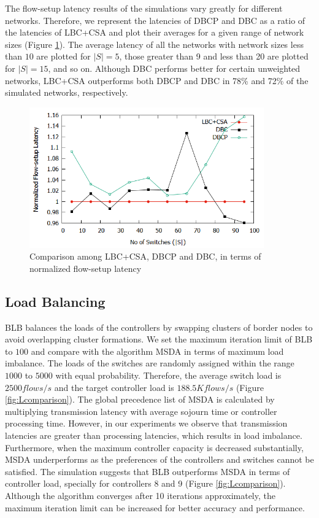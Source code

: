 \documentclass[preprint,12pt]{elsarticle}
\begin{document}
	The flow-setup latency results of the simulations vary greatly for different networks. Therefore, we represent the latencies of DBCP and DBC as a ratio of the latencies of LBC+CSA and plot their averages for a given range of network sizes (Figure \ref{fig:Fcomparison}). The average latency of all the networks with network sizes less than $10$ are plotted for $|S|=5$, those greater than 9 and less than 20 are plotted for $|S|=15$, and so on. Although DBC performs better for certain unweighted networks, LBC+CSA outperforms both DBCP and DBC in 78\% and 72\% of the simulated networks, respectively.
	
	\begin{figure}
		\centering
		\includegraphics[width=0.9\textwidth]{Images/forced_comparison.png}
		\caption{Comparison among LBC+CSA, DBCP and DBC, in terms of normalized flow-setup latency} \label{fig:Fcomparison}
	\end{figure}
	
	\subsection{Load Balancing} \label{LoadAnalysis}
	BLB balances the loads of the controllers by swapping clusters of border nodes to avoid overlapping cluster formations. We set the maximum iteration limit of BLB to $100$ and compare with the algorithm MSDA \cite{filali2018sdn, fragiadakis2016strategyproof} in terms of maximum load imbalance. The loads of the switches are randomly assigned within the range $1000$ to $5000$ with equal probability. Therefore, the average switch load is $2500 flows/s$ and the target controller load is $188.5K flows/s$ (Figure \ref{fig:Lcomparison}). The global precedence list of MSDA is calculated by multiplying transmission latency with average sojourn time or controller processing time. However, in our experiments we observe that transmission latencies are greater than processing latencies, which results in load imbalance. Furthermore, when the maximum controller capacity is decreased substantially, MSDA underperforms as the preferences of the controllers and switches cannot be satisfied. The simulation suggests that BLB outperforms MSDA in terms of controller load, specially for controllers 8 and 9 (Figure \ref{fig:Lcomparison}). Although the algorithm converges after 10 iterations approximately, the maximum iteration limit can be increased for better accuracy and performance.
	
\end{document}
